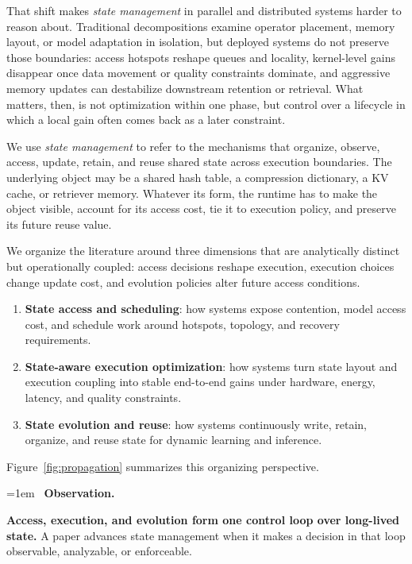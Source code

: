 \documentclass[manuscript,nonacm]{acmart}
\newenvironment{keybox}{%
  \par\smallskip\noindent
  \begin{lrbox}{\keyboxcontent}
  \begin{minipage}{\dimexpr\linewidth-2\fboxsep-2\fboxrule-1.5pt\relax}
  \raggedright
  \emergencystretch=1em
  {\color{keyborder}\faLightbulbO}\ \textbf{\textcolor{keyborder}{Observation.}}\space
}{%
  \end{minipage}
  \end{lrbox}
  \fcolorbox{keyborder}{keybg}{\usebox{\keyboxcontent}}%
  \par\smallskip
}
\begin{document}
That shift makes \emph{state management} in parallel and distributed systems harder to reason about. Traditional decompositions examine operator placement, memory layout, or model adaptation in isolation, but deployed systems do not preserve those boundaries: access hotspots reshape queues and locality, kernel-level gains disappear once data movement or quality constraints dominate, and aggressive memory updates can destabilize downstream retention or retrieval. What matters, then, is not optimization within one phase, but control over a lifecycle in which a local gain often comes back as a later constraint.

We use \emph{state management} to refer to the mechanisms that organize, observe, access, update, retain, and reuse shared state across execution boundaries. The underlying object may be a shared hash table, a compression dictionary, a KV cache, or retriever memory. Whatever its form, the runtime has to make the object visible, account for its access cost, tie it to execution policy, and preserve its future reuse value.

We organize the literature around three dimensions that are analytically distinct but operationally coupled: access decisions reshape execution, execution choices change update cost, and evolution policies alter future access conditions.

\begin{enumerate}[leftmargin=*]
\item \textbf{State access and scheduling}: how systems expose contention, model access cost, and schedule work around hotspots, topology, and recovery requirements.
\item \textbf{State-aware execution optimization}: how systems turn state layout and execution coupling into stable end-to-end gains under hardware, energy, latency, and quality constraints.
\item \textbf{State evolution and reuse}: how systems continuously write, retain, organize, and reuse state for dynamic learning and inference.
\end{enumerate}
Figure~\ref{fig:propagation} summarizes this organizing perspective.

\begin{keybox}
\textbf{Access, execution, and evolution form one control loop over long-lived state.} A paper advances state management when it makes a decision in that loop observable, analyzable, or enforceable.
\end{keybox}
\end{document}

